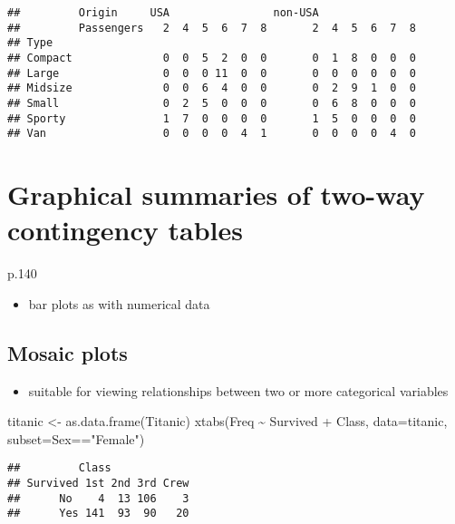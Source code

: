 \documentclass[
]{book}
\newenvironment{Shaded}{\begin{snugshade}}{\end{snugshade}}
\newcommand{\AttributeTok}[1]{\textcolor[rgb]{0.77,0.63,0.00}{#1}}
\newcommand{\FunctionTok}[1]{\textcolor[rgb]{0.00,0.00,0.00}{#1}}
\newcommand{\NormalTok}[1]{#1}
\newcommand{\OtherTok}[1]{\textcolor[rgb]{0.56,0.35,0.01}{#1}}
\newcommand{\SpecialCharTok}[1]{\textcolor[rgb]{0.00,0.00,0.00}{#1}}
\newcommand{\StringTok}[1]{\textcolor[rgb]{0.31,0.60,0.02}{#1}}
\providecommand{\tightlist}{%
  \setlength{\itemsep}{0pt}\setlength{\parskip}{0pt}}
\theoremstyle{definition}
\theoremstyle{definition}
\theoremstyle{definition}
\theoremstyle{definition}
\theoremstyle{remark}
\begin{document}
\begin{verbatim}
##         Origin     USA                non-USA               
##         Passengers   2  4  5  6  7  8       2  4  5  6  7  8
## Type                                                        
## Compact              0  0  5  2  0  0       0  1  8  0  0  0
## Large                0  0  0 11  0  0       0  0  0  0  0  0
## Midsize              0  0  6  4  0  0       0  2  9  1  0  0
## Small                0  2  5  0  0  0       0  6  8  0  0  0
## Sporty               1  7  0  0  0  0       1  5  0  0  0  0
## Van                  0  0  0  0  4  1       0  0  0  0  4  0
\end{verbatim}

\hypertarget{graphical-summaries-of-two-way-contingency-tables}{%
\section{Graphical summaries of two-way contingency tables}\label{graphical-summaries-of-two-way-contingency-tables}}

p.140

\begin{itemize}
\tightlist
\item
  bar plots as with numerical data
\end{itemize}

\hypertarget{mosaic-plots}{%
\subsection{Mosaic plots}\label{mosaic-plots}}

\begin{itemize}
\tightlist
\item
  suitable for viewing relationships between two or more categorical variables
\end{itemize}

\begin{Shaded}
\begin{Highlighting}[]
\NormalTok{titanic }\OtherTok{\textless{}{-}} \FunctionTok{as.data.frame}\NormalTok{(Titanic)}
\FunctionTok{xtabs}\NormalTok{(Freq }\SpecialCharTok{\textasciitilde{}}\NormalTok{ Survived }\SpecialCharTok{+}\NormalTok{ Class, }\AttributeTok{data=}\NormalTok{titanic, }\AttributeTok{subset=}\NormalTok{Sex}\SpecialCharTok{==}\StringTok{"Female"}\NormalTok{)}
\end{Highlighting}
\end{Shaded}

\begin{verbatim}
##         Class
## Survived 1st 2nd 3rd Crew
##      No    4  13 106    3
##      Yes 141  93  90   20
\end{verbatim}
\end{document}
